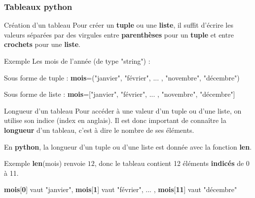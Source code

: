 \documentclass[9pt]{beamer}
\begin{document}
\begin{frame}
\frametitle{Tableaux python}

\begin{block}{Création d'un tableau}
Pour créer un \textbf{tuple} ou une \textbf{liste}, il suffit d'écrire les valeurs séparées par des virgules entre \textbf{parenthèses} pour un \textbf{tuple} et entre \textbf{crochets} pour une \textbf{liste}.
\end{block}

\begin{exampleblock}{Exemple}
Les mois de l'année (de type "string") :

Sous forme de tuple : \textbf{mois}=("janvier", "février", ... , "novembre", "décembre")

Sous forme de liste : \textbf{mois}=["janvier", "février", ... , "novembre", "décembre"]

\end{exampleblock}

\begin{block}{Longueur d'un tableau}
Pour accéder à une valeur d'un tuple ou d'une liste, on utilise son indice (index en anglais). Il est donc important de connaître la \textbf{longueur} d'un tableau, c'est à dire le nombre de ses éléments.\smallskip

En \textbf{python}, la longueur d'un tuple ou d'une liste est donnée avec la fonction \textbf{len}.
\end{block}

\begin{exampleblock}{Exemple}
\textbf{len}(mois) renvoie $12$, donc le tableau contient 12 éléments \textbf{indicés} de 0 à 11.

\textbf{mois}[\textbf{0}] vaut "janvier", \textbf{mois}[\textbf{1}] vaut "février", ... , \textbf{mois}[\textbf{11}] vaut "décembre"
\end{exampleblock}

\end{frame}
\end{document}
